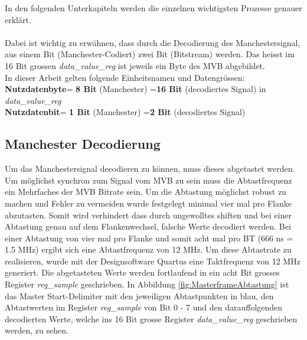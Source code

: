 In den folgenden Unterkapiteln werden die einzelnen wichtigsten Prozesse genauer erklärt.\\
\\
Dabei ist wichtig zu erwähnen, dass durch die Decodierung des Manchestersignal, aus einem Bit
(Manchester-Codiert) zwei Bit (Bitstream) werden. Das heisst im 16 Bit grossen 
\textit{data\_value\_reg} ist jeweils ein Byte des MVB abgebildet.\\
\newline
In dieser Arbeit gelten folgende Einheitsnamen und Datengrössen:\\
\textbf{Nutzdatenbyte}\hspace{0.1cm}= \textbf{8 Bit} (Manchester) =\hspace{0.1cm}\textbf{16 Bit} (decodiertes Signal) in \textit{data\_value\_reg}\\
\textbf{Nutzdatenbit}\hspace{0.37cm}= \textbf{1 Bit} (Manchester) =\hspace{0.3cm}\textbf{2  Bit} (decodiertes Signal)
\newpage
\subsection{Manchester Decodierung}
\label{Manchester Decodierung}

Um das Manchestersignal decodieren zu können, muss dieses abgetastet werden. Um möglichst synchron zum
Signal vom MVB zu sein muss die Abtastfrequenz ein Mehrfaches der MVB Bitrate sein. Um die Abtastung möglichst
robust zu machen und Fehler zu vermeiden wurde festgelegt minimal vier mal pro Flanke abzutasten. Somit
wird verhindert dass durch ungewolltes shiften und bei einer Abtastung genau auf dem Flankenwechsel, falsche Werte
decodiert werden.
Bei einer Abtastung von vier mal pro Flanke und somit acht mal pro BT (666 ns = 1.5 MHz) ergibt sich eine Abtastfrequenz von 12 MHz.
Um diese Abtastrate zu realisieren, wurde mit der Designsoftware Quartus eine Taktfrequenz von 12 MHz generiert.
Die abgetasteten Werte werden fortlaufend in ein acht Bit grosses Register \textit{reg\_sample} geschrieben.
In Abbildung \ref{fig:MasterframeAbtastung} ist das Master Start-Delimiter mit den
jeweiligen Abtastpunkten in blau, den Abtastwerten im Register \textit{reg\_sample} von Bit 0 - 7 und den darauffolgenden decodierten 
Werte, welche ins 16 Bit grosse Register \textit{data\_value\_reg} geschrieben werden, zu sehen.

